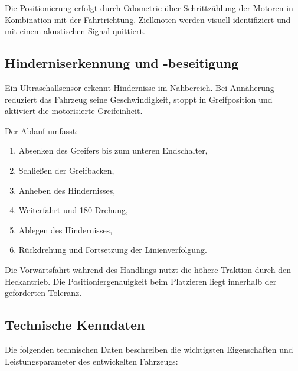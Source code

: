 \documentclass[main.tex]{subfiles} %
\begin{document}
Die Positionierung erfolgt durch Odometrie über Schrittzählung der Motoren in Kombination 
mit der Fahrtrichtung. Zielknoten werden visuell identifiziert und mit einem akustischen 
Signal quittiert.

\subsection{Hinderniserkennung und -beseitigung}

Ein Ultraschallsensor erkennt Hindernisse im Nahbereich. Bei Annäherung reduziert das 
Fahrzeug seine Geschwindigkeit, stoppt in Greifposition und aktiviert die motorisierte 
Greifeinheit.

Der Ablauf umfasst:
\begin{enumerate}
    \item Absenken des Greifers bis zum unteren Endschalter,
    \item Schließen der Greifbacken,
    \item Anheben des Hindernisses,
    \item Weiterfahrt und 180\textdegree-Drehung,
    \item Ablegen des Hindernisses,
    \item Rückdrehung und Fortsetzung der Linienverfolgung.
\end{enumerate}

Die Vorwärtsfahrt während des Handlings nutzt die höhere Traktion durch den Heckantrieb. 
Die Positioniergenauigkeit beim Platzieren liegt innerhalb der geforderten Toleranz.

\subsection{Technische Kenndaten}

Die folgenden technischen Daten beschreiben die wichtigsten Eigenschaften und
Leistungsparameter des entwickelten Fahrzeugs:
\end{document}
